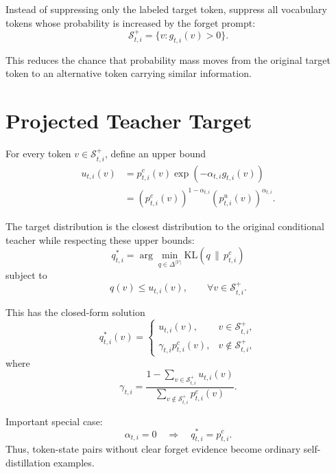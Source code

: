 \documentclass[10pt]{article}
\begin{document}
Instead of suppressing only the labeled target token, suppress all vocabulary
tokens whose probability is increased by the forget prompt:
\begin{equation}
\mathcal{S}^{+}_{t,i}
=
\{v:g_{t,i}(v)>0\}.
\end{equation}

This reduces the chance that probability mass moves from the original target
token to an alternative token carrying similar information.

\section{Projected Teacher Target}

For every token $v\in\mathcal{S}^{+}_{t,i}$, define an upper bound
\begin{align}
u_{t,i}(v)
&=
p^c_{t,i}(v)\exp\left(-\alpha_{t,i}g_{t,i}(v)\right)\\
&=
\left(p^c_{t,i}(v)\right)^{1-\alpha_{t,i}}
\left(p^u_{t,i}(v)\right)^{\alpha_{t,i}}.
\end{align}

The target distribution is the closest distribution to the original
conditional teacher while respecting these upper bounds:
\begin{equation}
q^*_{t,i}
=
\arg\min_{q\in\Delta^{|\mathcal{V}|}}
\mathrm{KL}\left(q\,\|\,p^c_{t,i}\right)
\end{equation}
subject to
\begin{equation}
q(v)\le u_{t,i}(v),
\qquad
\forall v\in\mathcal{S}^{+}_{t,i}.
\end{equation}

This has the closed-form solution
\begin{equation}
q^*_{t,i}(v)=
\begin{cases}
u_{t,i}(v), & v\in\mathcal{S}^{+}_{t,i},\\[4pt]
\gamma_{t,i}p^c_{t,i}(v), & v\notin\mathcal{S}^{+}_{t,i},
\end{cases}
\end{equation}
where
\begin{equation}
\gamma_{t,i}
=
\frac{
1-\sum_{v\in\mathcal{S}^{+}_{t,i}}u_{t,i}(v)
}{
\sum_{v\notin\mathcal{S}^{+}_{t,i}}p^c_{t,i}(v)
}.
\end{equation}

Important special case:
\begin{equation}
\alpha_{t,i}=0
\quad\Longrightarrow\quad
q^*_{t,i}=p^c_{t,i}.
\end{equation}
Thus, token-state pairs without clear forget evidence become ordinary
self-distillation examples.
\end{document}
